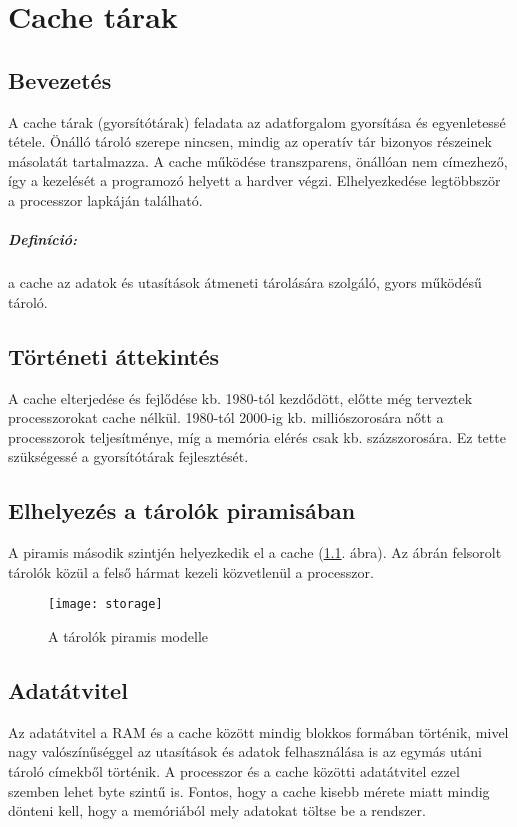 
\chapter{Cache tárak}

\section{Bevezetés}
A cache tárak (gyorsítótárak) feladata az adatforgalom gyorsítása és egyenletessé tétele.
Önálló tároló szerepe nincsen, mindig az operatív tár bizonyos részeinek másolatát tartalmazza.
A cache működése transzparens, önállóan nem címezhező, így a kezelését a programozó helyett a hardver végzi.
Elhelyezkedése legtöbbször a processzor lapkáján található.
\paragraph{Definíció:} a cache az adatok és utasítások átmeneti tárolására szolgáló, gyors működésű tároló.

\section{Történeti áttekintés}
A cache elterjedése és fejlődése kb. 1980-tól kezdődött, előtte még terveztek processzorokat cache nélkül.
1980-tól 2000-ig kb. milliószorosára nőtt a processzorok teljesítménye, míg a memória elérés csak kb. százszorosára.
Ez tette szükségessé a gyorsítótárak fejlesztését.

\section{Elhelyezés a tárolók piramisában}
A piramis második szintjén helyezkedik el a cache (\ref{fig:storage}. ábra). Az ábrán felsorolt tárolók közül a felső hármat kezeli közvetlenül a processzor.
\begin{figure}[H]
    \texttt{[image: storage]}
    \centering
    \caption{A tárolók piramis modelle}
    \label{fig:storage}
\end{figure}

\section{Adatátvitel}
Az adatátvitel a RAM és a cache között mindig blokkos formában történik, mivel nagy valószínűséggel az utasítások és adatok felhasználása is az egymás utáni tároló címekből történik.
A processzor és a cache közötti adatátvitel ezzel szemben lehet byte szintű is.
Fontos, hogy a cache kisebb mérete miatt mindig dönteni kell, hogy a memóriából mely adatokat töltse be a rendszer.

